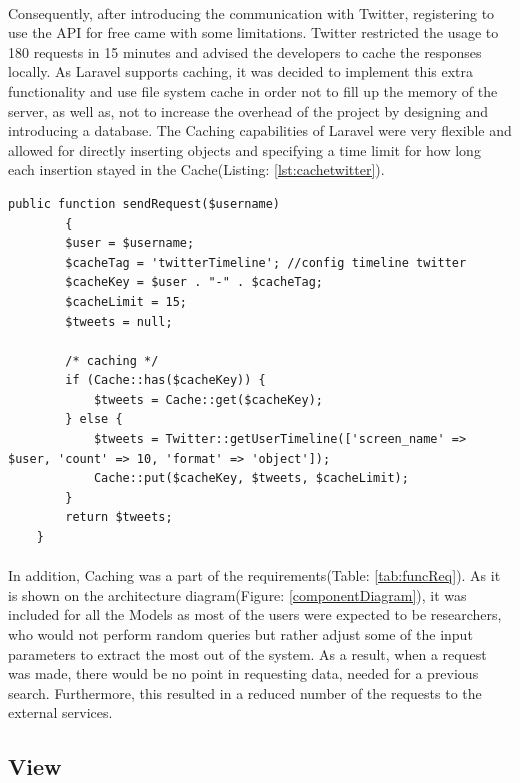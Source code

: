 \documentclass{l4proj}
\begin{document}
\paragraph{}
Consequently, after introducing the communication with Twitter, registering to use the API for free came with some limitations. Twitter restricted the usage to 180 requests in 15 minutes and advised the developers to cache the responses locally. As Laravel supports caching, it was decided to implement this extra functionality and use file system cache in order not to fill up the memory of the server, as well as, not to increase the overhead of the project by designing and introducing a database. The Caching capabilities of Laravel were very flexible and allowed for directly inserting objects and specifying a time limit for how long each insertion stayed in the Cache(Listing: \ref{lst:cachetwitter}). 
\begin{lstlisting}[caption={Caching the response from Twitter},label={lst:cachetwitter}]
    public function sendRequest($username)
	    {
	    $user = $username;
	    $cacheTag = 'twitterTimeline'; //config timeline twitter
	    $cacheKey = $user . "-" . $cacheTag;
	    $cacheLimit = 15;
	    $tweets = null;
	    
	    /* caching */
	    if (Cache::has($cacheKey)) {
		    $tweets = Cache::get($cacheKey);
	    } else {
		    $tweets = Twitter::getUserTimeline(['screen_name' => $user, 'count' => 10, 'format' => 'object']);
		    Cache::put($cacheKey, $tweets, $cacheLimit);
	    }
	    return $tweets;
    }
\end{lstlisting}
\paragraph{}
In addition, Caching was a part of the requirements(Table: \ref{tab:funcReq}). As it is shown on the architecture diagram(Figure: \ref{componentDiagram}), it was included for all the Models as most of the users were expected to be researchers, who would not perform random queries but rather adjust some of the input parameters to extract the most out of the system. As a result, when a request was made, there would be no point in requesting data, needed for a previous search. Furthermore, this resulted in a reduced number of the requests to the external services. 


\subsection{View}
\label{sub:view}
\end{document}
